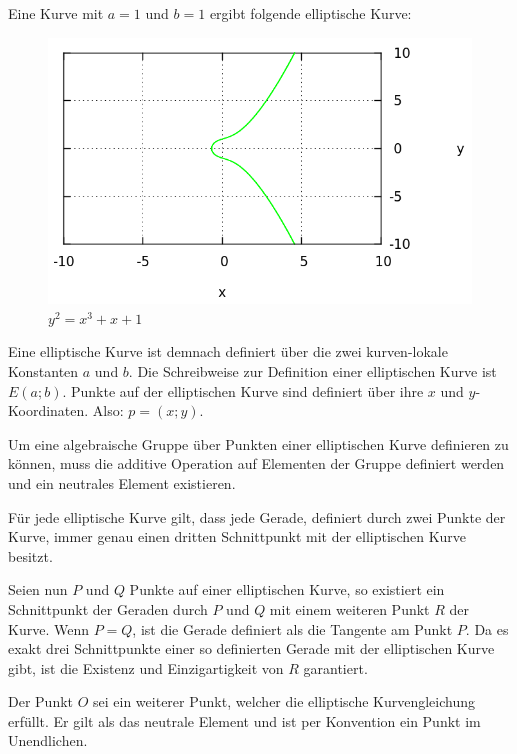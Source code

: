 Eine Kurve mit $a = 1$ und $b = 1$ ergibt folgende elliptische Kurve:

\begin{figure}[H]
	\begin{center}
		\includegraphics[keepaspectratio=true, scale=0.4]{./pictures/example_curve_2a.png}
	\end{center}
	\caption{$y^2 = x^3 +x +1$}\label{example_2}
\end{figure}

Eine elliptische Kurve ist demnach definiert über die zwei kurven-lokale Konstanten $a$ und $b$.
Die Schreibweise zur Definition einer elliptischen Kurve ist $E(a;b)$.
Punkte auf der elliptischen Kurve sind definiert über ihre $x$ und $y$-Koordinaten. Also: $p = (x;y)$.

Um eine algebraische Gruppe über Punkten einer elliptischen Kurve definieren zu können, muss die additive
Operation auf Elementen der Gruppe definiert werden und ein neutrales Element existieren.

Für jede elliptische Kurve gilt, dass jede Gerade, definiert durch zwei Punkte der Kurve, immer genau einen
dritten Schnittpunkt mit der elliptischen Kurve besitzt.

Seien nun $P$ und $Q$ Punkte auf einer elliptischen Kurve, so existiert ein Schnittpunkt der Geraden durch $P$
und $Q$ mit einem weiteren Punkt $R$ der Kurve. Wenn $P = Q$, ist die Gerade definiert als die Tangente am
Punkt $P$. Da es exakt drei Schnittpunkte einer so definierten Gerade mit der elliptischen Kurve gibt, 
ist die Existenz und Einzigartigkeit von $R$ garantiert.

Der Punkt $O$ sei ein weiterer Punkt, welcher die elliptische Kurvengleichung erfüllt. Er gilt als das neutrale
Element und ist per Konvention ein Punkt im Unendlichen.


